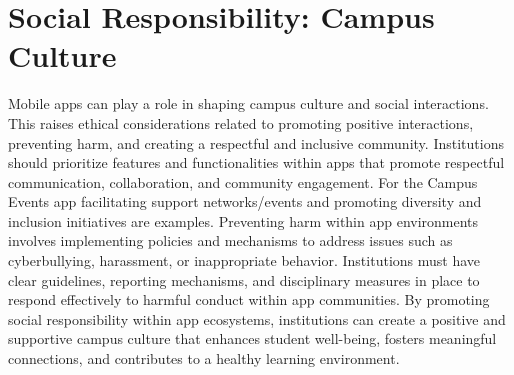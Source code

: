 \documentclass[10pt,twocolumn]{article}
\begin{document}
\section{Social Responsibility: Campus Culture}
Mobile apps can play a role in shaping campus culture and social interactions. This raises ethical considerations related to promoting positive interactions, preventing harm, and creating a respectful and inclusive community.
Institutions should prioritize features and functionalities within apps that promote respectful communication, collaboration, and community engagement. For the Campus Events app facilitating support networks/events and promoting diversity and inclusion initiatives are examples.
Preventing harm within app environments involves implementing policies and mechanisms to address issues such as cyberbullying, harassment, or inappropriate behavior. Institutions must have clear guidelines, reporting mechanisms, and disciplinary measures in place to respond effectively to harmful conduct within app communities.
By promoting social responsibility within app ecosystems, institutions can create a positive and supportive campus culture that enhances student well-being, fosters meaningful connections, and contributes to a healthy learning environment.
\end{document}
